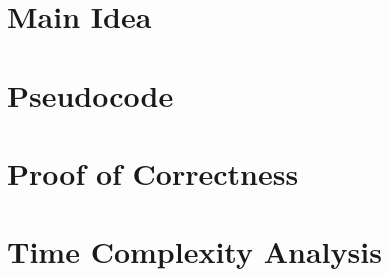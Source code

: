 \documentclass{article}
\begin{document}
\section{Main Idea}

\section{Pseudocode}

\section{Proof of Correctness}

\section{Time Complexity Analysis}
\end{document}
